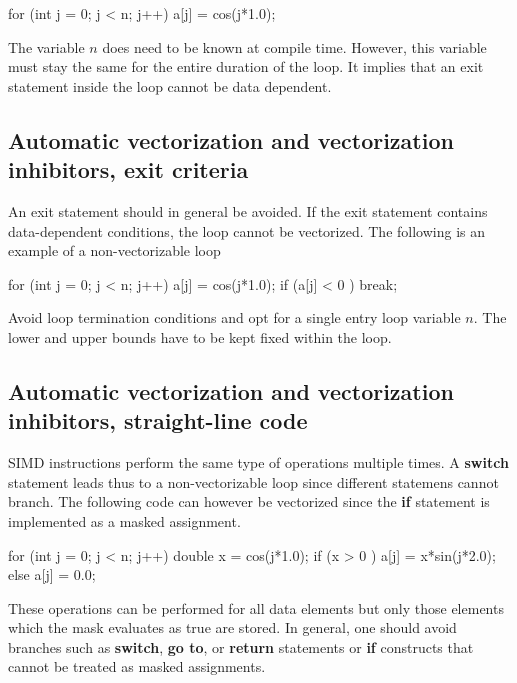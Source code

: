 \documentclass[%
oneside,                 %
final,                   %
10pt]{article}
\begin{document}
\bcppcod
  for (int j = 0; j < n; j++) {
    a[j] = cos(j*1.0);
  }

\ecppcod

The variable $n$ does need to be known at compile time. However, this variable must stay the same for the entire duration of the loop. It implies that an exit statement inside the loop cannot be data dependent.

\subsection{Automatic vectorization and vectorization inhibitors, exit criteria}

An exit statement should in general be avoided. 
If the exit statement contains data-dependent conditions, the loop cannot be vectorized. 
The following is an example of a non-vectorizable loop





\bcppcod
  for (int j = 0; j < n; j++) {
    a[j] = cos(j*1.0);
    if (a[j] < 0 ) break;
  }

\ecppcod

Avoid loop termination conditions and opt for a single entry loop variable $n$. The lower and upper bounds have to be kept fixed within the loop. 

\subsection{Automatic vectorization and vectorization inhibitors, straight-line code}

SIMD instructions perform the same type of operations multiple times. 
A \textbf{switch} statement leads thus to a non-vectorizable loop since different statemens cannot branch.
The following code can however be vectorized since the \textbf{if} statement is implemented as a masked assignment.










\bcppcod
  for (int j = 0; j < n; j++) {
    double x  = cos(j*1.0);
    if (x > 0 ) {
       a[j] =  x*sin(j*2.0); 
    }
    else {
       a[j] = 0.0;
    }
  }

\ecppcod

These operations can be performed for all data elements but only those elements which the mask evaluates as true are stored. In general, one should avoid branches such as \textbf{switch}, \textbf{go to}, or \textbf{return} statements or \textbf{if} constructs that cannot be treated as masked assignments. 
\end{document}

